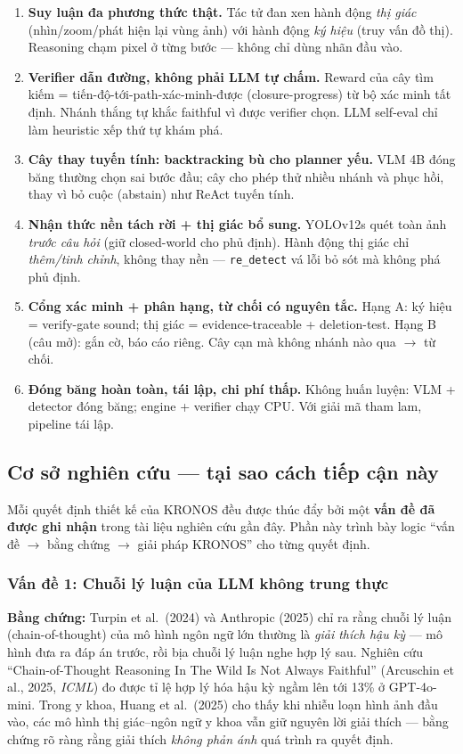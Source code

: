 \documentclass[11pt,a4paper]{article}
\begin{document}
\begin{enumerate}[leftmargin=1.5em]
  \item \textbf{Suy luận đa phương thức thật.} Tác tử đan xen hành động \emph{thị giác} (nhìn/zoom/phát hiện lại vùng ảnh) với hành động \emph{ký hiệu} (truy vấn đồ thị). Reasoning chạm pixel ở từng bước --- không chỉ dùng nhãn đầu vào.
  \item \textbf{Verifier dẫn đường, không phải LLM tự chấm.} Reward của cây tìm kiếm = tiến-độ-tới-path-xác-minh-được (closure-progress) từ bộ xác minh tất định. Nhánh thắng tự khắc faithful vì được verifier chọn. LLM self-eval chỉ làm heuristic xếp thứ tự khám phá.
  \item \textbf{Cây thay tuyến tính: backtracking bù cho planner yếu.} VLM 4B đóng băng thường chọn sai bước đầu; cây cho phép thử nhiều nhánh và phục hồi, thay vì bỏ cuộc (abstain) như ReAct tuyến tính.
  \item \textbf{Nhận thức nền tách rời + thị giác bổ sung.} YOLOv12s quét toàn ảnh \emph{trước câu hỏi} (giữ closed-world cho phủ định). Hành động thị giác chỉ \emph{thêm/tinh chỉnh}, không thay nền --- \texttt{re\_detect} vá lỗi bỏ sót mà không phá phủ định.
  \item \textbf{Cổng xác minh + phân hạng, từ chối có nguyên tắc.} Hạng A: ký hiệu = verify-gate sound; thị giác = evidence-traceable + deletion-test. Hạng B (câu mở): gắn cờ, báo cáo riêng. Cây cạn mà không nhánh nào qua $\to$ từ chối.
  \item \textbf{Đóng băng hoàn toàn, tái lập, chi phí thấp.} Không huấn luyện: VLM + detector đóng băng; engine + verifier chạy CPU. Với giải mã tham lam, pipeline tái lập.
\end{enumerate}

\subsection{Cơ sở nghiên cứu --- tại sao cách tiếp cận này}

Mỗi quyết định thiết kế của KRONOS đều được thúc đẩy bởi một \textbf{vấn đề đã được ghi nhận} trong tài liệu nghiên cứu gần đây. Phần này trình bày logic ``vấn đề $\to$ bằng chứng $\to$ giải pháp KRONOS'' cho từng quyết định.

\subsubsection{Vấn đề 1: Chuỗi lý luận của LLM không trung thực}

\textbf{Bằng chứng:} Turpin et al.\ (2024) và Anthropic (2025) chỉ ra rằng chuỗi lý luận (chain-of-thought) của mô hình ngôn ngữ lớn thường là \emph{giải thích hậu kỳ} --- mô hình đưa ra đáp án trước, rồi bịa chuỗi lý luận nghe hợp lý sau. Nghiên cứu ``Chain-of-Thought Reasoning In The Wild Is Not Always Faithful'' (Arcuschin et al., 2025, \textit{ICML}) đo được tỉ lệ hợp lý hóa hậu kỳ ngầm lên tới 13\% ở GPT-4o-mini. Trong y khoa, Huang et al.\ (2025) cho thấy khi nhiễu loạn hình ảnh đầu vào, các mô hình thị giác--ngôn ngữ y khoa vẫn giữ nguyên lời giải thích --- bằng chứng rõ ràng rằng giải thích \emph{không phản ánh} quá trình ra quyết định.
\end{document}
